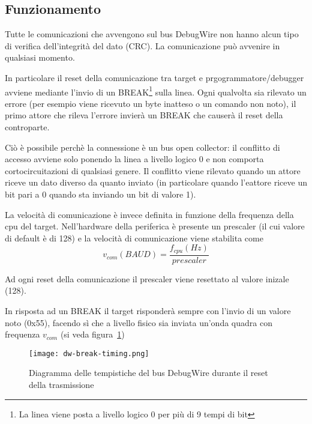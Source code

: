 \subsection{Funzionamento}

Tutte le comunicazioni che avvengono sul bus DebugWire non hanno alcun tipo di verifica dell'integrità del dato (CRC). La comunicazione può avvenire in qualsiasi momento.

In particolare il reset della comunicazione tra target e prgogrammatore/debugger avviene mediante l'invio di un BREAK\footnote{La linea viene posta a livello logico 0 per più di 9 tempi di bit} sulla linea.
Ogni qualvolta sia rilevato un errore (per esempio viene ricevuto un byte inatteso o un comando non noto), il primo attore che rileva l'errore invierà un BREAK che causerà il reset della controparte.

Ciò è possibile perchè la connessione è un bus open collector: il conflitto di accesso avviene solo ponendo la linea a livello logico 0 e non comporta cortocircuitazioni di qualsiasi genere. Il conflitto viene rilevato quando un attore riceve un dato diverso da quanto inviato (in particolare quando l'eattore riceve un bit pari a 0 quando sta inviando un bit di valore 1).

La velocità di comunicazione è invece definita in funzione della frequenza della cpu del target. Nell'hardware della periferica è presente un prescaler (il cui valore di default è di 128) e la velocità di comunicazione viene stabilita come \[v_{com} (BAUD) = \frac{f_{cpu} (Hz)}{prescaler}\]

Ad ogni reset della comunicazione il prescaler viene resettato al valore inizale (128).


In risposta ad un BREAK il target risponderà sempre con l'invio di un valore noto (0x55), facendo sì che a livello fisico sia inviata un'onda quadra con frequenza \(v_{com}\)\cite{site:dw-reverse-engeneering} (si veda figura~\ref{fig:dw-timings})

\begin{figure}[h]
    \centering
    \texttt{[image: dw-break-timing.png]}
    \caption[]{Diagramma delle tempistiche del bus DebugWire durante il reset della trasmissione}\label{fig:dw-timings}
\end{figure}


